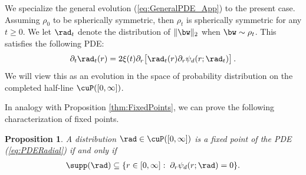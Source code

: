 \documentclass[11pt]{article}
\newtheorem{proposition}{Proposition}
\begin{document}
We specialize the general evolution (\ref{eq:GeneralPDE_App}) to the present case. Assuming $\rho_0$ to be spherically symmetric, then $\rho_t$ is spherically symmetric for any $t \ge 0$.
We let $\rad_t$ denote the distribution of $\|\bw\|_2$ when $\bw\sim\rho_t$. This satisfies the following PDE: 
%
\begin{align}
%
\partial_t\rad_t(r) = 2\xi(t)\partial_r\big[\rad_t(r) \partial_r\psi_d(r;\rad_t) \big]\, . \label{eq:PDERadial}
%
\end{align}
%
We will view this as an evolution in the space of probability distribution on the completed half-line
$\cuP([0, \infty])$.


In analogy with Proposition \ref{thm:FixedPoints}, we can prove the following characterization of fixed points.
%
\begin{proposition}\label{propo:FixedPointdRadial}
A distribution $\rad\in \cuP([0,\infty])$ is a fixed point of the PDE (\ref{eq:PDERadial}) if and only if 
%
\begin{align}
\supp(\rad) \subseteq \{r\in [0,\infty]: \;\partial_r \psi_d(r; \rad) = 0 \}.\label{eq:FixedPointRadial}
\end{align}
%
\end{proposition}
%
%
\end{document}
